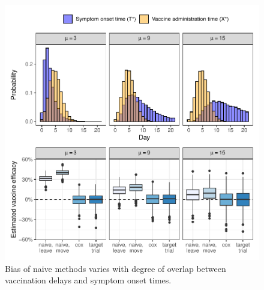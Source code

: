 \begin{appendix}
    \begin{figure}[p]
        \centering
        \includegraphics{../../../../3_figures/sim_overlap.pdf}
        \caption{Bias of naive methods varies with degree of overlap between vaccination delays and symptom onset times.\label{fig:sim_overlap}}
    \end{figure}

    
    \clearpage





\end{appendix}
